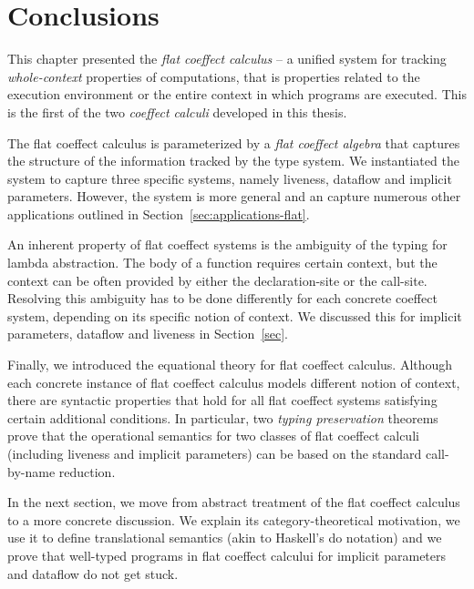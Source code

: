 \section{Conclusions}

This chapter presented the \emph{flat coeffect calculus} -- a unified system for tracking
\emph{whole-context} properties of computations, that is properties related to the
execution environment or the entire context in which programs are executed.
This is the first of the two \emph{coeffect calculi} developed in this thesis.

The flat coeffect calculus is parameterized by a \emph{flat coeffect algebra} that captures
the structure of the information tracked by the type system. We instantiated the system to
capture three specific systems, namely liveness, dataflow and implicit parameters. However,
the system is more general and an capture numerous other applications outlined in
Section~\ref{sec:applications-flat}.

An inherent property of flat coeffect systems is the ambiguity of the typing for lambda
abstraction. The body of a function requires certain context, but the context can be often
provided by either the declaration-site or the call-site. Resolving this ambiguity has to be
done differently for each concrete coeffect system, depending on its specific notion of context.
We discussed this for implicit parameters, dataflow and liveness in Section~\ref{sec}.

Finally, we introduced the equational theory for flat coeffect calculus. Although each
concrete instance of flat coeffect calculus models different notion of context, there are
syntactic properties that hold for all flat coeffect systems satisfying certain additional
conditions. In particular, two \emph{typing preservation} theorems prove that the operational
semantics for two classes of flat coeffect calculi (including liveness and implicit parameters)
can be based on the standard call-by-name reduction.

In the next section, we move from abstract treatment of the flat coeffect calculus to a more
concrete discussion. We explain its category-theoretical motivation, we use it to define
translational semantics (akin to Haskell's do notation) and we prove that well-typed programs
in flat coeffect calcului for implicit parameters and dataflow do not get stuck.
